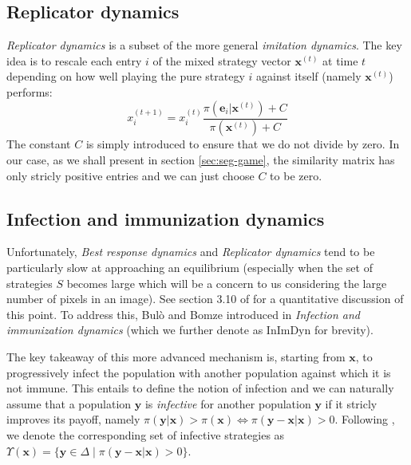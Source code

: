 \documentclass[11pt,a4paper]{article}
\begin{document}
\subsection*{Replicator dynamics}
\textit{Replicator dynamics} is a subset of the more general \textit{imitation dynamics}. The key idea is to rescale each entry $i$ of the mixed strategy vector $\mathbf{x}^{(t)}$ at time $t$ depending on how well playing the pure strategy $i$ against itself (namely $\mathbf{x}^{(t)}$) performs:
\begin{equation}
    \label{eq:replicator-dynamics}
    x_i^{(t+1)} = x_i^{(t)}\frac{\pi(\mathbf{e}_i|\mathbf{x}^{(t)}) + C}{\pi(\mathbf{x}^{(t)}) + C}
\end{equation}
The constant $C$ is simply introduced to ensure that we do not divide by zero. In our case, as we shall present in section \ref{sec:seg-game}, the similarity matrix has only stricly positive entries and we can just choose $C$ to be zero.

\subsection*{Infection and immunization dynamics}
Unfortunately, \textit{Best response dynamics} and \textit{Replicator dynamics} tend to be particularly slow at approaching an equilibrium (especially when the set of strategies $S$ becomes large which will be a concern to us considering the large number of pixels in an image). See section 3.10 of \cite{bulo-thesis} for a quantitative discussion of this point. To address this, Bulò and Bomze introduced in \cite{inimdyn} \textit{Infection and immunization dynamics} (which we further denote as InImDyn for brevity).   

The key takeaway of this more advanced mechanism is, starting from $\mathbf{x}$, to progressively infect the population with another population against which it is not immune. This entails to define the notion of infection and we can naturally assume that a population $\mathbf{y}$ is \textit{infective} for another population $\mathbf{y}$ if it stricly improves its payoff, namely $\pi(\mathbf{y}|\mathbf{x})>\pi(\mathbf{x})\iff\pi(\mathbf{y}-\mathbf{x}|\mathbf{x})>0$. Following \cite{bulo-thesis}, we denote the corresponding set of infective strategies as $\Upsilon(\mathbf{x})=\{\mathbf{y}\in\Delta\; |\; \pi(\mathbf{y}-\mathbf{x}|\mathbf{x})>0\}$.
\end{document}

